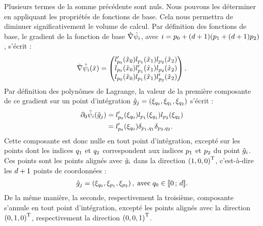 Plusieurs termes de la somme précédente sont nuls.
Nous pouvons les déterminer en appliquant les propriétés de fonctions de
base. Cela nous permettra de diminuer significativement le volume de calcul.
Par définition des fonctions de base, le gradient de la fonction de base
$\hat{\nabla} \hat{\psi}_{i}$, avec $i = {p_{0}} + (d + 1)({p_{1}} + (d + 1){p_{2}})$,
s'écrit :
\begin{align}
	\hat{\nabla} \hat{\psi}_{i}(\hat{x}) =
	\begin{pmatrix}
		l'_{p_{0}}(\hat{x}_0)
		l_{p_{1}}(\hat{x}_1)
		l_{p_{2}}(\hat{x}_2) \\
		l_{p_{0}}(\hat{x}_0)
		l'_{p_{1}}(\hat{x}_1)
		l_{p_{2}}(\hat{x}_2) \\
		l_{p_{0}}(\hat{x}_0)
		l_{p_{1}}(\hat{x}_1)
		l'_{p_{2}}(\hat{x}_2)
	\end{pmatrix} .
\end{align}
Par définition des polynômes de Lagrange, la valeur de la première composante
de ce gradient sur un point d’intégration
$\hat{g}_{j} = \left(\xi_{q_{0}},\xi_{q_{1}},\xi_{q_{2}}\right)$
s'écrit :
\begin{equation}
	\begin{aligned}
		\partial_{0} \hat{\psi}_{i}(\hat{g}_{j}) &=
		l'_{p_{0}}(\xi_{q_{0}})
		l_{p_{1}}(\xi_{q_{1}})
		l_{p_{2}}(\xi_{q_{2}}) \\
		&= l'_{p_{0}}(\xi_{q_{0}})
		\delta_{{p_{1}},{q_{1}}}
		\delta_{{p_{2}},{q_{2}}} .
	\end{aligned}
\end{equation}
Cette composante est donc nulle en tout point d’intégration, excepté sur les points
dont les indices ${q_{1}}$ et ${q_{2}}$ correspondent aux indices ${p_{1}}$ et ${p_{2}}$ du point
$\hat{g}_{i}$. Ces points sont les points alignés avec $\hat{g}_{i}$ dans
la direction $\left(1,0,0\right)^{\mathrm{T}}$, c’est-à-dire les $d + 1$ points de coordonnées :
\begin{align}
	\hat{g}_{j} = \left(\xi_{q_{0}},\xi_{p_{1}},\xi_{p_{2}}\right) ,
	\; \mathrm{avec} \; {q_{0}} \in \lbrack\!\lbrack0\,;\,d\rbrack\!\rbrack .
\end{align}
De la même manière, la seconde, respectivement la troisième, composante
s’annule en tout point d’intégration, excepté les points alignés avec
la direction $\left(0,1,0\right)^{\mathrm{T}}$, respectivement la direction $\left(0,0,1\right)^{\mathrm{T}}$.


